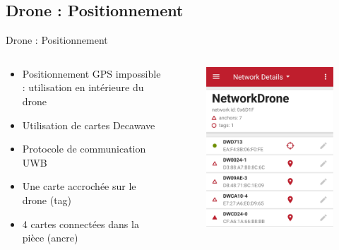     \subsection{Drone : Positionnement}
            \begin{frame}[allowframebreaks]{Drone : Positionnement}
                \begin{columns}
                    \begin{column}{0.5\textwidth}
                        \begin{block}{}
                            \begin{itemize}
                                [square]
                                \item Positionnement GPS impossible : utilisation en intérieure du drone
                                \item Utilisation de cartes Decawave
                                \item Protocole de communication UWB
                                \item Une carte accrochée sur le drone (tag)
                                \item 4 cartes connectées dans la pièce (ancre)
                            \end{itemize}
                        \end{block}
                    \end{column}\hfill
                    \begin{column}{0.5\textwidth}
                        \begin{figure}[H]
                            \centering
                            \includegraphics[width=0.9\linewidth]{images/UI_Decawave1.png}

\end{figure}
\end{column}
\end{columns}
\end{frame}
